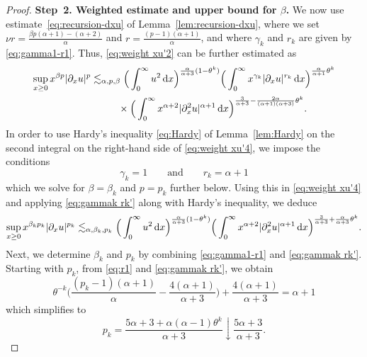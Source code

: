 \documentclass[reqno,12pt]{amsart}
\renewcommand{\d}{\ensuremath{\mathrm{d}}}
\renewcommand{\d}{\ensuremath{{\rm d}}}
\numberwithin{equation}{section}
\begin{document}
\begin{proof}
\noindent\textbf{Step~2. Weighted estimate and upper bound for $\beta$.} 
%
We now use estimate~\eqref{eq:recursion-dxu} of Lemma~\ref{lem:recursion-dxu}, where we set $\nu r = \frac{\beta p(\alpha +1) -(\alpha+2)}{\alpha}$ and $r = \frac{(p-1) (\alpha+1)}{\alpha}$, and where $\gamma_k$ and $r_k$ are given by \eqref{eq:gamma1-r1}. Thus, \eqref{eq:weight xu'2} can be further estimated as
%
\begin{align}
\sup_{x \ge 0} x^{\beta p} |\partial_x u|^p 
&\lesssim_{\alpha,p,\beta} \Big(  \int_0^\infty  u^2 \, \d x \Big)^{\frac{\alpha}{\alpha+3} (1-\theta^k)} \Big( \int_0^\infty x^{\gamma_k}
|\partial_x u|^{r_k} \, \d x \Big)^{\frac{\alpha}{\alpha+1} \theta^k}
\nonumber \\
&\phantom{\lesssim_{\alpha,p,\beta}} \times
\Big( \int_0^\infty  x^{\alpha+2} |\partial_x^2 u|^{\alpha+1} \, \d x\Big)^{\frac{3}{\alpha+3} - \frac{2 \alpha}{(\alpha+1)(\alpha+3)} \theta^k}. \label{eq:weight xu'4}
\end{align}
%
In order to use Hardy’s inequality \eqref{eq:Hardy} of Lemma~\ref{lem:Hardy} on the second integral on the right-hand side of \eqref{eq:weight xu'4}, we impose the conditions
%
\begin{equation}\label{eq:gammak rk'}
    \gamma_k = 1\qquad \text{and} \qquad r_{k} = \alpha +1
 \end{equation}
which we solve for $\beta = \beta_k$ and $p = p_k$ further below. 
%
Using this in \eqref{eq:weight xu'4} and applying \eqref{eq:gammak rk'} along with Hardy’s inequality, we deduce
%
\begin{equation}\label{eq:weight xu'5}
 \sup_{x \ge 0} x^{\beta_k p_k} |\partial_x u|^{p_k} 
 \lesssim_{\alpha,\beta_k,p_k} \Big(  \int_0^\infty  u^2 \, \d x \Big)^{\frac{\alpha}{\alpha+3} (1-\theta^k)}  \Big( \int_0^\infty x^{\alpha+2}
 |\partial_x^2 u|^{\alpha+1} \, \d x \Big)^{\frac{3}{\alpha+3} + \frac{\alpha}{\alpha+3}\theta^k}.
 \end{equation}
%
 Next, we determine $\beta_k$ and $p_k$ by combining \eqref{eq:gamma1-r1} and \eqref{eq:gammak rk'}. Starting with $p_k$, from \eqref{eq:r1} and \eqref{eq:gammak rk'}, we obtain
\begin{equation*}
\theta^{-k} \Big( \frac{(p_k-1)(\alpha+1)}{\alpha} - \frac{4(\alpha+1)}{\alpha+3} \Big) + \frac{4(\alpha+1)}{\alpha+3} = \alpha +1
 \end{equation*}
%
which simplifies to
%
\begin{equation*}
p_k=\frac{5 \alpha +3 + \alpha (\alpha-1) \theta^k}{\alpha+3} \downarrow \frac{5\alpha+3}{\alpha+3}.

\end{equation*}
\end{proof}
\end{document}
